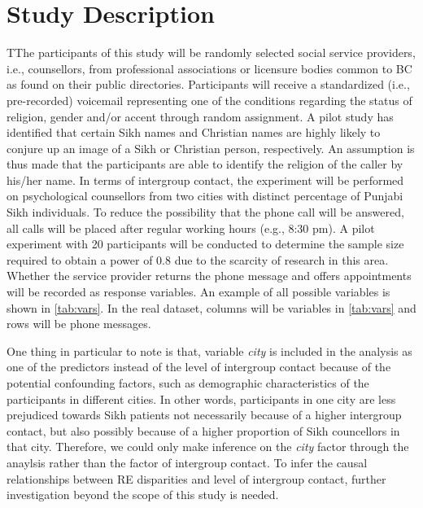 \documentclass[11pt]{article}
\begin{document}
\section{Study Description}
TThe participants of  this study will be randomly selected social service providers, i.e.,  counsellors,  from professional associations or licensure bodies common to BC as found on their public directories.  Participants will receive a standardized (i.e., pre-recorded) voicemail representing one of the conditions regarding the status of religion, gender and/or accent through random assignment. A pilot study has identified that certain Sikh names and Christian names are highly likely to conjure up an image of a Sikh or Christian person, respectively. An assumption is thus made that the participants are able to identify  the religion of the caller by his/her name. In terms of intergroup contact, the experiment will be performed on psychological counsellors from two cities with distinct percentage of Punjabi Sikh individuals. To reduce the possibility that the phone call will be answered, all calls will be placed after regular working hours (e.g., 8:30 pm). A pilot experiment with 20 participants will be conducted to determine the sample size required to obtain a power of 0.8 due to the scarcity of research in this area. Whether the service provider returns the phone message and offers appointments will be recorded as response variables. An example of all possible variables is shown in \autoref{tab:vars}. In the real dataset, columns will be variables in \autoref{tab:vars} and rows will be phone messages. 

One thing in particular to note is that, variable \textit{city} is included in the analysis as one of the predictors instead of the level of intergroup contact because of the potential confounding factors, such as demographic characteristics of the participants in different cities. In other words, participants in one city are less prejudiced towards Sikh patients not necessarily because of a higher intergroup contact, but also possibly because of a higher proportion of Sikh councellors in that city. Therefore, we could only make inference on the \textit{city} factor through the anaylsis rather than the factor of intergroup contact. To infer the causal relationships between RE disparities and level of intergroup contact, further investigation beyond the scope of this study is needed.
\end{document}
